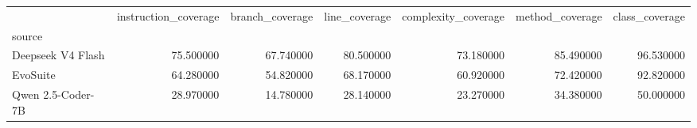\begin{tabular}{lrrrrrr}
\toprule
 & instruction_coverage & branch_coverage & line_coverage & complexity_coverage & method_coverage & class_coverage \\
source &  &  &  &  &  &  \\
\midrule
Deepseek V4 Flash & 75.500000 & 67.740000 & 80.500000 & 73.180000 & 85.490000 & 96.530000 \\
EvoSuite & 64.280000 & 54.820000 & 68.170000 & 60.920000 & 72.420000 & 92.820000 \\
Qwen 2.5-Coder-7B & 28.970000 & 14.780000 & 28.140000 & 23.270000 & 34.380000 & 50.000000 \\
\bottomrule
\end{tabular}
